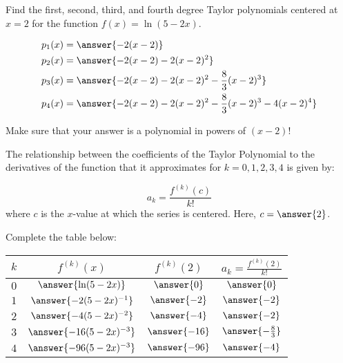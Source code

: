 \documentclass{ximera}
\author{Jim Talamo}
\begin{document}
\begin{exercise}
Find the first, second, third, and fourth degree Taylor polynomials centered at $x=2$ for the function $f(x) = \ln(5-2x)$.

\begin{align*}
p_1(x) &= \answer{-2(x-2)} \\
p_2(x) &= \answer{-2(x-2)-2(x-2)^2} \\
p_3(x) &= \answer{-2(x-2)-2(x-2)^2-\frac{8}{3}(x-2)^3} \\
p_4(x) &= \answer{-2(x-2)-2(x-2)^2-\frac{8}{3}(x-2)^3-4(x-2)^4}
\end{align*}

\begin{hint}
Make sure that your answer is a polynomial in powers of $(x-2)$!

The relationship between the coefficients of the Taylor Polynomial to the derivatives of the function that it approximates for $k=0,1,2, 3, 4$ is given by:

\[
a_k = \frac{f^{(k)}(c)}{k!}
\]
where $c$ is the $x$-value at which the series is centered.  Here, $c=\answer{2}$.  

\begin{question}
Complete the table below:

\begin{tabular}{|c|c|c|c|}
\hline
$k$ \quad & \quad \quad $f^{(k)}(x)$  \quad \quad & \quad \quad $f^{(k)}(2)$ \quad \quad & \quad \quad $a_k = \frac{f^{(k)}(2)}{k!}$ \quad \quad \\
\hline 
$0$ \quad & \quad \quad $\answer{\ln(5-2x)}$  \quad \quad & \quad \quad $\answer{0}$ \quad \quad  & \quad \quad $\answer{0}$ \quad \quad \\
\hline
$1$ \quad & \quad \quad $\answer{-2(5-2x)^{-1}}$ \quad \quad & \quad \quad $\answer{-2}$ \quad \quad & \quad \quad  $\answer{-2}$ \quad \quad  \\
\hline
$2$ \quad & \quad \quad $\answer{-4(5-2x)^{-2}}$ \quad \quad & \quad \quad $\answer{-4}$ \quad \quad & \quad \quad  $\answer{-2}$ \quad \quad  \\
\hline
$3$ \quad & \quad \quad $\answer{-16(5-2x)^{-3}}$ \quad \quad & \quad \quad $\answer{-16}$ \quad \quad & \quad \quad  $\answer{-\frac{8}{3}}$ \quad \quad  \\
\hline
$4$ \quad & \quad \quad $\answer{-96(5-2x)^{-3}}$ \quad \quad & \quad \quad $\answer{-96}$ \quad \quad & \quad \quad  $\answer{-4}$ \quad \quad  \\
\hline
\end{tabular}


\end{question}
\end{hint}
\end{exercise}
\end{document}
